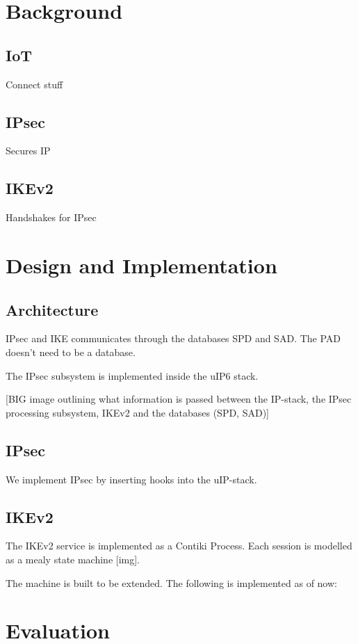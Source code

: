 \documentclass[final,letterpaper,twoside,12pt,twocolumn]{report}
\begin{document}
\chapter{Background}

\section{IoT}
Connect stuff

\section{IPsec}
Secures IP

\section{IKEv2}
Handshakes for IPsec

\chapter{Design and Implementation}
\section{Architecture}
IPsec and IKE communicates through the databases SPD and SAD. The PAD doesn't need to be a database.

The IPsec subsystem is implemented inside the uIP6 stack.

[BIG image outlining what information is passed between the IP-stack, the IPsec processing subsystem, IKEv2 and the databases (SPD, SAD)]

\section{IPsec}
We implement IPsec by inserting hooks into the uIP-stack.

\section{IKEv2}
The IKEv2 service is implemented as a Contiki Process. Each session is modelled as a mealy state machine [img].

The machine is built to be extended. The following is implemented as of now:


\chapter{Evaluation}
\end{document}
